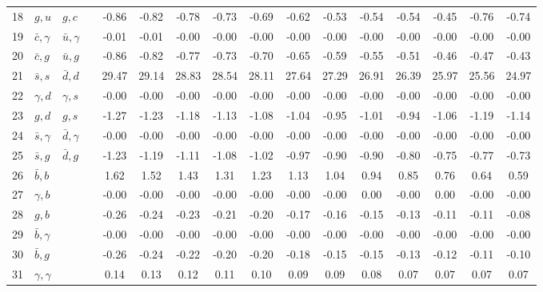 \begin{tabularx}{\textwidth}{rXXX@{}S@{}S@{}S@{}S@{}S@{}S@{}S@{}S@{}S@{}S@{}S@{}S}
 18 & $g,u$            & $g,c$            &                 & -0.86 & -0.82 & -0.78 & -0.73 & -0.69 & -0.62 & -0.53 & -0.54 & -0.54 & -0.45 & -0.76 & -0.74 \\
 19 & $\bar c,\gamma$  & $\bar u,\gamma$  &                 & -0.01 & -0.01 & -0.00 & -0.00 & -0.00 & -0.00 & -0.00 & -0.00 & -0.00 & -0.00 & -0.00 & -0.00 \\
 20 & $\bar c, g$      & $\bar u, g$      &                 & -0.86 & -0.82 & -0.77 & -0.73 & -0.70 & -0.65 & -0.59 & -0.55 & -0.51 & -0.46 & -0.47 & -0.43 \\
 21 & $\bar s, s$      & $\bar d, d$      &                 & 29.47 & 29.14 & 28.83 & 28.54 & 28.11 & 27.64 & 27.29 & 26.91 & 26.39 & 25.97 & 25.56 & 24.97 \\
 22 & $\gamma, d$      & $\gamma, s$      &                 & -0.00 & -0.00 & -0.00 & -0.00 & -0.00 & -0.00 & -0.00 & -0.00 & -0.00 & -0.00 & -0.00 & -0.00 \\
 23 & $g,d$            & $g,s$            &                 & -1.27 & -1.23 & -1.18 & -1.13 & -1.08 & -1.04 & -0.95 & -1.01 & -0.94 & -1.06 & -1.19 & -1.14 \\
 24 & $\bar s,\gamma$  & $\bar d,\gamma$  &                 & -0.00 & -0.00 & -0.00 & -0.00 & -0.00 & -0.00 & -0.00 & -0.00 & -0.00 & -0.00 & -0.00 & -0.00 \\
 25 & $\bar s,g$       & $\bar d, g$      &                 & -1.23 & -1.19 & -1.11 & -1.08 & -1.02 & -0.97 & -0.90 & -0.90 & -0.80 & -0.75 & -0.77 & -0.73 \\
 26 & $\bar b,b$       &                  &                 &  1.62 &  1.52 &  1.43 &  1.31 &  1.23 &  1.13 &  1.04 &  0.94 &  0.85 &  0.76 &  0.64 &  0.59 \\
 27 & $\gamma, b$      &                  &                 & -0.00 & -0.00 & -0.00 & -0.00 & -0.00 & -0.00 & -0.00 &  0.00 & -0.00 &  0.00 & -0.00 & -0.00 \\
 28 & $g,b$            &                  &                 & -0.26 & -0.24 & -0.23 & -0.21 & -0.20 & -0.17 & -0.16 & -0.15 & -0.13 & -0.11 & -0.11 & -0.08 \\
 29 & $\bar b,\gamma$  &                  &                 & -0.00 & -0.00 & -0.00 & -0.00 & -0.00 & -0.00 & -0.00 & -0.00 & -0.00 & -0.00 & -0.00 & -0.00 \\
 30 & $\bar b,g$       &                  &                 & -0.26 & -0.24 & -0.22 & -0.20 & -0.20 & -0.18 & -0.15 & -0.15 & -0.13 & -0.12 & -0.11 & -0.10 \\
 31 & $\gamma,\gamma$  &                  &                 &  0.14 &  0.13 &  0.12 &  0.11 &  0.10 &  0.09 &  0.09 &  0.08 &  0.07 &  0.07 &  0.07 &  0.07 \\

\end{tabularx}

